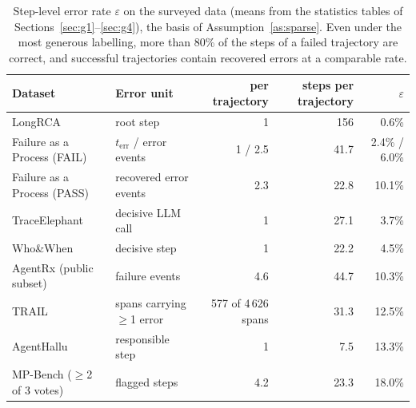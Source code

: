 \documentclass[10pt,a4paper]{article}
\begin{document}
\begin{table}[h]\centering\small
\begin{tabular}{@{}llrrr@{}}\toprule
Dataset & Error unit & per trajectory & steps per trajectory & $\varepsilon$ \\\midrule
LongRCA & root step & 1 & 156 & 0.6\% \\
Failure as a Process (FAIL) & $t_{\mathrm{err}}$ / error events & 1 / 2.5 & 41.7 & 2.4\% / 6.0\% \\
Failure as a Process (PASS) & recovered error events & 2.3 & 22.8 & 10.1\% \\
TraceElephant & decisive LLM call & 1 & 27.1 & 3.7\% \\
Who\&When & decisive step & 1 & 22.2 & 4.5\% \\
AgentRx (public subset) & failure events & 4.6 & 44.7 & 10.3\% \\
TRAIL & spans carrying $\ge$1 error & 577 of 4\,626 spans & 31.3 & 12.5\% \\
AgentHallu & responsible step & 1 & 7.5 & 13.3\% \\
MP-Bench ($\ge$2 of 3 votes) & flagged steps & 4.2 & 23.3 & 18.0\% \\\bottomrule
\end{tabular}
\caption{Step-level error rate $\varepsilon$ on the surveyed data (means from the statistics tables of Sections~\ref{sec:g1}--\ref{sec:g4}), the basis of Assumption~\ref{as:sparse}. Even under the most generous labelling, more than 80\% of the steps of a failed trajectory are correct, and successful trajectories contain recovered errors at a comparable rate.}
\label{tab:contam}
\end{table}
\end{document}
